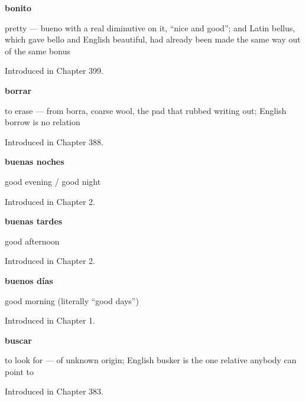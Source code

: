\noindent\begin{minipage}[t]{\linewidth}
\raggedright
\textbf{bonito}\par
\small pretty — bueno with a real diminutive on it, \textquotedblleft{}nice and good\textquotedblright{}; and Latin bellus, which gave bello and English beautiful, had already been made the same way out of the same bonus\par
\footnotesize Introduced in Chapter 399.
\end{minipage}\par\medskip

\noindent\begin{minipage}[t]{\linewidth}
\raggedright
\textbf{borrar}\par
\small to erase — from borra, coarse wool, the pad that rubbed writing out; English borrow is no relation\par
\footnotesize Introduced in Chapter 388.
\end{minipage}\par\medskip

\noindent\begin{minipage}[t]{\linewidth}
\raggedright
\textbf{buenas noches}\par
\small good evening / good night\par
\footnotesize Introduced in Chapter 2.
\end{minipage}\par\medskip

\noindent\begin{minipage}[t]{\linewidth}
\raggedright
\textbf{buenas tardes}\par
\small good afternoon\par
\footnotesize Introduced in Chapter 2.
\end{minipage}\par\medskip

\noindent\begin{minipage}[t]{\linewidth}
\raggedright
\textbf{buenos días}\par
\small good morning (literally \textquotedblleft{}good days\textquotedblright{})\par
\footnotesize Introduced in Chapter 1.
\end{minipage}\par\medskip

\noindent\begin{minipage}[t]{\linewidth}
\raggedright
\textbf{buscar}\par
\small to look for — of unknown origin; English busker is the one relative anybody can point to\par
\footnotesize Introduced in Chapter 383.
\end{minipage}\par\medskip

